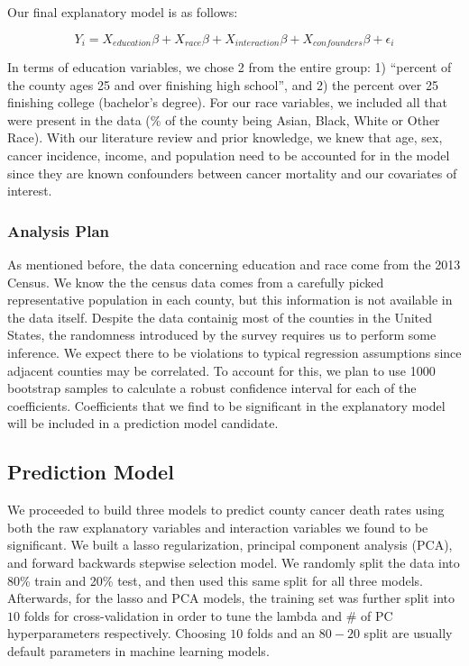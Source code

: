 \documentclass[
  11pt,
]{article}
\begin{document}
Our final explanatory model is as follows:

\[
Y_i = X_{education}\beta + X_{race}\beta + X_{interaction}\beta + X_{confounders}\beta + \epsilon_i
\]

In terms of education variables, we chose 2 from the entire group: 1)
``percent of the county ages 25 and over finishing high school'', and 2)
the percent over 25 finishing college (bachelor's degree). For our race
variables, we included all that were present in the data (\% of the
county being Asian, Black, White or Other Race). With our literature
review and prior knowledge, we knew that age, sex, cancer incidence,
income, and population need to be accounted for in the model since they
are known confounders between cancer mortality and our covariates of
interest.

\hypertarget{analysis-plan}{%
\subsubsection{Analysis Plan}\label{analysis-plan}}

As mentioned before, the data concerning education and race come from
the 2013 Census. We know the the census data comes from a carefully
picked representative population in each county, but this information is
not available in the data itself. Despite the data containig most of the
counties in the United States, the randomness introduced by the survey
requires us to perform some inference. We expect there to be violations
to typical regression assumptions since adjacent counties may be
correlated. To account for this, we plan to use 1000 bootstrap samples
to calculate a robust confidence interval for each of the coefficients.
Coefficients that we find to be significant in the explanatory model
will be included in a prediction model candidate.

\hypertarget{prediction-model}{%
\subsection{Prediction Model}\label{prediction-model}}

We proceeded to build three models to predict county cancer death rates
using both the raw explanatory variables and interaction variables we
found to be significant. We built a lasso regularization, principal
component analysis (PCA), and forward backwards stepwise selection
model. We randomly split the data into 80\% train and 20\% test, and
then used this same split for all three models. Afterwards, for the
lasso and PCA models, the training set was further split into \(10\)
folds for cross-validation in order to tune the lambda and \(\#\) of PC
hyperparameters respectively. Choosing \(10\) folds and an \(80-20\)
split are usually default parameters in machine learning models.
\end{document}
